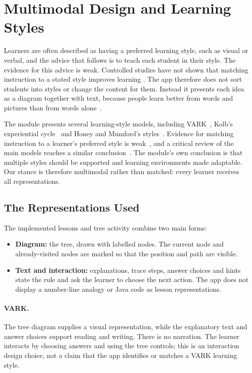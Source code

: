 \section{Multimodal Design and Learning Styles}\label{sec:id-multimodal}

Learners are often described as having a preferred learning style, such as visual or verbal, and the advice that follows is to teach each student in their style. The evidence for this advice is weak. Controlled studies have not shown that matching instruction to a stated style improves learning \cite{Pashler2008}. The app therefore does not sort students into styles or change the content for them. Instead it presents each idea as a diagram together with text, because
people learn better from words and pictures than from words
alone~\cite{Mayer_2020}.

The module presents several learning-style models, including VARK~\cite{Fleming1992}, Kolb's experiential cycle~\cite{Kolb1984} and Honey and Mumford's styles~\cite{Honey1992}. Evidence for matching instruction to a learner's preferred style is weak~\cite{Pashler2008}, and a critical review of the main models reaches a similar conclusion~\cite{Coffield2004}. The module's own conclusion is that multiple styles should be supported and learning environments made adaptable. Our stance is therefore multimodal rather than matched: every learner receives all representations.

\subsection{The Representations Used}
The implemented lessons and tree activity combine two main forms:

\begin{itemize}
    \item \textbf{Diagram:} the tree, drawn with labelled nodes. The current node and already-visited nodes are marked so that the position and path are visible.
    \item \textbf{Text and interaction:} explanations, trace steps, answer choices and hints state the rule and ask the learner to choose the next action. The app does not display a number-line analogy or Java code as lesson representations.
\end{itemize}

\paragraph{VARK.} The tree diagram supplies a visual representation, while the explanatory text and answer choices support reading and writing. There is no narration. The learner interacts by choosing answers and using the tree controls; this is an interaction design choice, not a claim that the app identifies or matches a VARK learning style.
 
